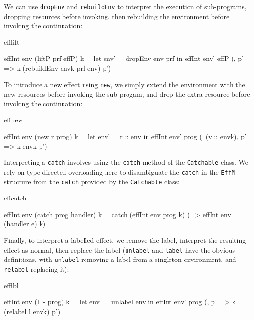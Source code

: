 \noindent
We can use \texttt{dropEnv} and \texttt{rebuildEnv} to interpret the execution
of sub-programs, dropping resources before invoking, then rebuilding the
environment before invoking the continuation:

\begin{SaveVerbatim}{efflift}

effInt env (liftP prf effP) k 
  = let env' = dropEnv env prf in 
        effInt env' effP (\envk, p' => 
              k (rebuildEnv envk prf env) p')

\end{SaveVerbatim}

\noindent
To introduce a new effect using \texttt{new}, we simply extend the environment
with the new resources before invoking the sub-progam, and drop the extra
resource before invoking the continuation:

\begin{SaveVerbatim}{effnew}

effInt env (new r prog) k 
     = let env' = r :: env in 
           effInt env' prog 
               (\ (v :: envk), p' => k envk p')

\end{SaveVerbatim}

\noindent
Interpreting a \texttt{catch} involves using the \texttt{catch} method of
the \texttt{Catchable} class. We rely on type directed overloading here to
disambiguate the \texttt{catch} in the \texttt{EffM} structure from the
\texttt{catch} provided by the \texttt{Catchable} class:

\begin{SaveVerbatim}{effcatch}

effInt env (catch prog handler) k 
     = catch (effInt env prog k)
             (\e => effInt env (handler e) k)

\end{SaveVerbatim}

\noindent
Finally, to interpret a labelled effect, we remove the label, interpret the
resulting effect as normal, then replace the label (\texttt{unlabel} and
\texttt{label} have the obvious definitions, with \texttt{unlabel} removing
a label from a singleton environment, and \texttt{relabel} replacing it):

\begin{SaveVerbatim}{efflbl}

effInt env (l :- prog) k 
   = let env' = unlabel env in
         effInt env' prog (\envk, p' => 
                              k (relabel l envk) p')

\end{SaveVerbatim}

